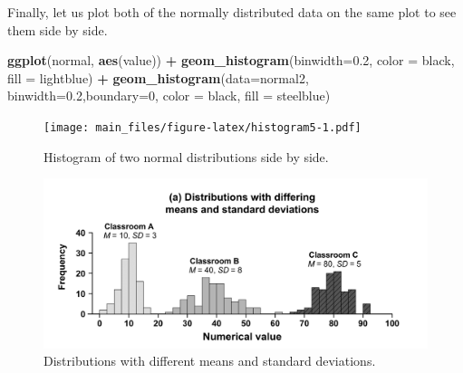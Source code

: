 \documentclass[
]{book}
\newenvironment{Shaded}{\begin{snugshade}}{\end{snugshade}}
\newcommand{\AttributeTok}[1]{\textcolor[rgb]{0.13,0.29,0.53}{#1}}
\newcommand{\DecValTok}[1]{\textcolor[rgb]{0.00,0.00,0.81}{#1}}
\newcommand{\FloatTok}[1]{\textcolor[rgb]{0.00,0.00,0.81}{#1}}
\newcommand{\FunctionTok}[1]{\textcolor[rgb]{0.13,0.29,0.53}{\textbf{#1}}}
\newcommand{\NormalTok}[1]{#1}
\newcommand{\SpecialCharTok}[1]{\textcolor[rgb]{0.81,0.36,0.00}{\textbf{#1}}}
\newcommand{\StringTok}[1]{\textcolor[rgb]{0.31,0.60,0.02}{#1}}
\begin{document}
Finally, let us plot both of the normally distributed data on the same plot to see them side by side.

\begin{Shaded}
\begin{Highlighting}[]
\FunctionTok{ggplot}\NormalTok{(normal, }\FunctionTok{aes}\NormalTok{(value)) }\SpecialCharTok{+}
        \FunctionTok{geom\_histogram}\NormalTok{(}\AttributeTok{binwidth=}\FloatTok{0.2}\NormalTok{,}
                       \AttributeTok{color =} \StringTok{\textquotesingle{}black\textquotesingle{}}\NormalTok{,}
                       \AttributeTok{fill =} \StringTok{\textquotesingle{}lightblue\textquotesingle{}}\NormalTok{) }\SpecialCharTok{+}
          \FunctionTok{geom\_histogram}\NormalTok{(}\AttributeTok{data=}\NormalTok{normal2, }\AttributeTok{binwidth=}\FloatTok{0.2}\NormalTok{,}\AttributeTok{boundary=}\DecValTok{0}\NormalTok{,}
                       \AttributeTok{color =} \StringTok{\textquotesingle{}black\textquotesingle{}}\NormalTok{,}
                       \AttributeTok{fill =} \StringTok{\textquotesingle{}steelblue\textquotesingle{}}\NormalTok{)}
\end{Highlighting}
\end{Shaded}

\begin{figure}
\centering
\texttt{[image: main\_files/figure-latex/histogram5-1.pdf]}
\caption{\label{fig:histogram5}Histogram of two normal distributions side by side.}
\end{figure}

\begin{figure}
\centering
\includegraphics{./img/descriptives2/data_distribution.png}
\caption{\label{fig:normaldatadistributions}Distributions with different means and standard deviations.}
\end{figure}
\end{document}
